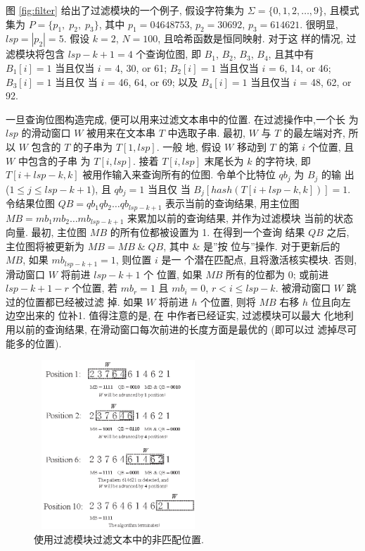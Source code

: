 图 \ref{fig:filter} 给出了过滤模块的一个例子, 假设字符集为
$\Sigma = \{0, 1, 2, \dots, 9\}$, 且模式集为 $P = \{p_1,\; p_2,\;
p_3\}$, 其中 $p_1 = 04648753$, $p_2 = 30692$, $p_3 = 614621$. 很明显,
$lsp = |p_2|= 5$. 假设 $k = 2$, $N = 100$, 且哈希函数是恒同映射. 对于这
样的情况, 过滤模块将包含 $lsp - k + 1 = 4$ 个查询位图, 即 $B_1$,
$B_2$, $B_3$, $B_4$, 且其中有 $B_1[i] = 1$ 当且仅当 $i$ = 4, 30, or
61; $B_2[i] = 1$ 当且仅当 $i$ = 6, 14, or 46; $B_3[i] = 1$ 当且仅
当 $i$ = 46, 64, or 69; 以及 $B_4[i] = 1$ 当且仅当 $i$ = 48, 62, or
92.

一旦查询位图构造完成, 便可以用来过滤文本串中的位置. 在过滤操作中,一个长
为 $lsp$ 的滑动窗口 $W$ 被用来在文本串 $T$ 中选取子串. 最初,
$W$ 与 $T$ 的最左端对齐, 所以 $W$ 包含的 $T$ 的子串为 $T[1,lsp]$. 一般
地, 假设 $W$ 移动到 $T$ 的第 $i$ 个位置, 且 $W$ 中包含的子串
为 $T[i,lsp]$. 接着 $T[i,lsp]$ 末尾长为 $k$ 的字符块, 即 $T[i+lsp-k,
k]$ 被用作输入来查询所有的位图. 令单个比特位 $qb_j$ 为 $B_j$ 的输
出 ($1 \leq j \leq lsp - k + 1$), 且 $qb_j=1$ 当且仅
当 $B_j[hash(T[i+lsp-k,k])] = 1$. 令结果位图
$QB = qb_1qb_2 \dots qb_{lsp-k+1}$ 表示当前的查询结果, 用主位图
$MB = mb_1mb_2 \dots mb_{lsp-k+1}$ 来累加以前的查询结果, 并作为过滤模块
当前的状态向量. 最初, 主位图 $MB$ 的所有位都被设置为 1. 在得到一个查询
结果 $QB$ 之后, 主位图将被更新为 $MB = MB \; \& \; QB$, 其中 \& 是''按
位与''操作. 对于更新后的 $MB$, 如果 $mb_{lsp-k+1} = 1$, 则位置 $i$ 是一
个潜在匹配点, 且将激活核实模块. 否则, 滑动窗口 $W$ 将前进 $lsp-k+1$ 个
位置, 如果 $MB$ 所有的位都为 0; 或前进 $lsp-k+1-r$ 个位置, 若 $mb_r=1$
且 $mb_i=0$, $r < i \leq lsp-k$. 被滑动窗口 $W$ 跳过的位置都已经被过滤
掉.  如果 $W$ 将前进 $h$ 个位置, 则将 $MB$ 右移 $h$ 位且向左边空出来的
位补1. 值得注意的是, 在 \cite{Lee2013} 中作者已经证实, 过滤模块可以最大
化地利用以前的查询结果, 在滑动窗口每次前进的长度方面是最优的 (即可以过
滤掉尽可能多的位置).

\begin{figure}[!h]
  \centering
  \includegraphics[height=2.5in, width=2.5in]{figures/2_MPM/filter_match}
  \caption{使用过滤模块过滤文本中的非匹配位置.}
  \label{fig:f_match}
\end{figure}

